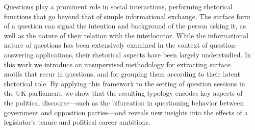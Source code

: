 Questions play a prominent role in social interactions, performing rhetorical functions that go beyond that of simple informational exchange.  The surface form of a question can signal the intention and background of the person asking it, as well as the nature of their relation with the interlocutor.  While the informational nature of questions has been extensively examined in the context of question-answering applications, their rhetorical aspects have been largely understudied. In this work we introduce an unsupervised methodology for extracting surface motifs that recur in questions, and for grouping them according to their latent rhetorical role.  By applying this framework to the setting of question sessions in the UK parliament, we show that the resulting typology encodes key aspects of the political discourse---such as the bifurcation in questioning behavior between government and opposition parties---and reveals new insights into the effects of a legislator's tenure and political career ambitions.
